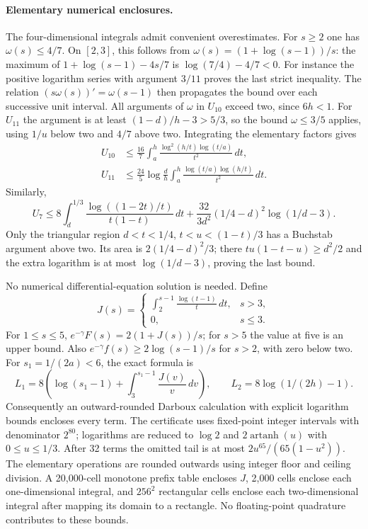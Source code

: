 \documentclass[11pt]{article}
\begin{document}
\paragraph{Elementary numerical enclosures.}
The four-dimensional integrals admit convenient overestimates. For
$s\ge2$ one has $\omega(s)\le4/7$. On $[2,3]$, this follows from
$\omega(s)=(1+\log(s-1))/s$: the maximum of
$1+\log(s-1)-4s/7$ is $\log(7/4)-4/7<0$. For instance the positive
logarithm series with argument $3/11$ proves the last strict inequality.
The relation $(s\omega(s))'=\omega(s-1)$ then propagates the bound
over each successive unit interval. All arguments of $\omega$ in
$U_{10}$ exceed two, since $6h<1$. For $U_{11}$ the argument is
at least $(1-d)/h-3>5/3$, so the bound $\omega\le3/5$ applies,
using $1/u$ below two and $4/7$ above two.
Integrating the elementary factors gives
\begin{align*}
 U_{10}&\le\frac{16}{7}\int_a^h
          \frac{\log^2(h/t)\log(t/a)}{t^2}\,dt,\\
 U_{11}&\le\frac{24}{5}\log\frac dh\int_a^h
      \frac{\log(t/a)\log(h/t)}{t^2}\,dt.
\end{align*}
Similarly,
\[
 U_7\le8\int_d^{1/3}\frac{\log((1-2t)/t)}{t(1-t)}\,dt
       +\frac{32}{3d^2}(1/4-d)^2\log(1/d-3).
\]
Only the triangular region $d<t<1/4$, $t<u<(1-t)/3$ has a
Buchstab argument above two. Its area is $2(1/4-d)^2/3$;
there $tu(1-t-u)\ge d^2/2$ and the extra logarithm is at most
$\log(1/d-3)$, proving the last bound.

No numerical differential-equation solution is needed. Define
\[
 J(s)=\begin{cases}\displaystyle\int_2^{s-1}
                   \frac{\log(t-1)}t\,dt,&s>3,\\0,&s\le3.
       \end{cases}
\]
For $1\le s\le5$, $e^{-\gamma}F(s)=2(1+J(s))/s$;
for $s>5$ the value at five is an upper bound. Also
$e^{-\gamma}f(s)\ge2\log(s-1)/s$ for $s>2$, with zero below two.
For $s_1=1/(2a)<6$, the exact formula is
\[
 L_1=8\left(\log(s_1-1)+\int_3^{s_1-1}\frac{J(v)}v\,dv\right),
 \qquad L_2=8\log(1/(2h)-1).
\]
Consequently an outward-rounded Darboux calculation with explicit
logarithm bounds encloses every term. The certificate uses fixed-point
integer intervals with denominator $2^{80}$; logarithms are reduced to
$\log 2$ and $2\operatorname{artanh}(u)$ with $0\le u\le1/3$.
After 32 terms the omitted tail is at most
$2u^{65}/(65(1-u^2))$. The elementary operations are rounded outwards
using integer floor and ceiling division. A 20,000-cell monotone
prefix table encloses $J$, 2,000 cells enclose each one-dimensional
integral, and $256^2$ rectangular cells enclose each two-dimensional
integral after mapping its domain to a rectangle. No floating-point
quadrature contributes to these bounds.
\end{document}
